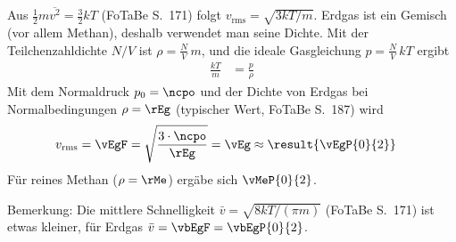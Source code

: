 Aus $\frac{1}{2}m\overline{v^2} = \frac{3}{2}kT$ (FoTaBe S.~171) folgt $v_\text{rms} = \sqrt{3kT/m}$. Erdgas ist ein Gemisch (vor allem Methan), deshalb verwendet man seine Dichte. Mit der Teilchenzahldichte $N/V$ ist $\rho = \frac{N}{V}\,m$, und die ideale Gasgleichung $p = \frac{N}{V}\,kT$ ergibt
\begin{align}
 \frac{kT}{m} &= \frac{p}{\rho}
\end{align}
Mit dem Normaldruck $p_0 = \ncpo$ und der Dichte von Erdgas bei Normalbedingungen $\rho = \rEg$ (typischer Wert, FoTaBe S.~187) wird
\begin{align}
 v_\text{rms} &= \vEgF = \sqrt{\frac{3\cdot\ncpo}{\rEg}} = \vEg \approx \result{\vEgP{0}{2}}
\end{align}
Für reines Methan ($\rho = \rMe$) ergäbe sich $\vMeP{0}{2}$.

Bemerkung: Die mittlere Schnelligkeit $\bar v = \sqrt{8kT/(\pi m)}$ (FoTaBe S.~171) ist etwas kleiner, für Erdgas $\bar v = \vbEgF = \vbEgP{0}{2}$.
